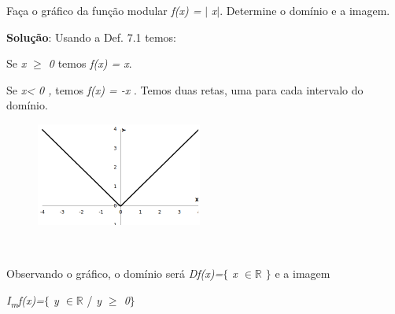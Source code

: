 \begin{texemplo}

Faça o gráfico da função modular \textit{f(x) =} $ \vert $ \textit{x}$ \vert $. Determine o domínio e a imagem.  

\textbf{Solução}: Usando a Def. 7.1 temos:

\quad Se \textit{x $ \geq $  0} temos \textit{f(x) = x}.

\quad Se \textit{x< 0 , } temos \textit{f(x) = -x }. Temos duas retas, uma para cada intervalo do domínio.

\begin{figure}[H]
	\begin{Center}
		\includegraphics{capitulos/outras_funcoes/media/image24.pdf}
	\end{Center}
\end{figure}

~~

\quad Observando o gráfico, o domínio será   \textit{Df(x)=$ \{ $ x $ \in \mathbb{R} $  \textbf{ }$ \} $ } e a imagem 

\quad  \textit{I\textsubscript{m}f(x)=$ \{ $ y $ \in \mathbb{R} $  }/ \textit{y $ \geq $  0$ \} $ } \qedsymbol{}
\end{texemplo}

